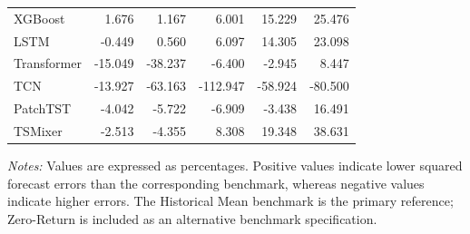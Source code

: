 \documentclass[12pt,twoside]{ord}
\makeatletter
\providecommand{\FloatBarrier}{\par\ifx\@deferlist\@empty\else\clearpage\fi}
\makeatother
\begin{document}
\begin{table}[htbp]
\begin{tabular}{lrrrrr}
XGBoost        &  1.676 &  1.167 &   6.001 &  15.229 & 25.476 \\
LSTM           & -0.449 &  0.560 &   6.097 &  14.305 & 23.098 \\
Transformer    & -15.049 & -38.237 &  -6.400 &  -2.945 &  8.447 \\
TCN            & -13.927 & -63.163 & -112.947 & -58.924 & -80.500 \\
PatchTST       & -4.042 & -5.722 &  -6.909 &  -3.438 & 16.491 \\
TSMixer        & -2.513 & -4.355 &   8.308 &  19.348 & 38.631 \\
\hline
\end{tabular}
\par\vspace{4pt}\parbox{\linewidth}{\fontsize{9pt}{12pt}\selectfont\textit{Notes:} Values are expressed as percentages. Positive values indicate lower squared forecast errors than the corresponding benchmark, whereas negative values indicate higher errors. The Historical Mean benchmark is the primary reference; Zero-Return is included as an alternative benchmark specification.}
\end{table}
\FloatBarrier
\end{document}
